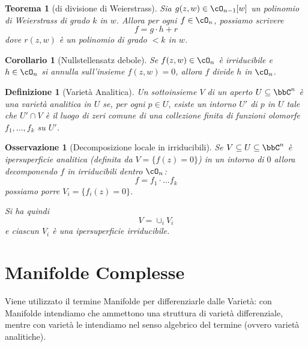 \documentclass[a4paper,11pt]{article}
\newtheorem{teorema}{Teorema}
\newtheorem{definizione}{Definizione}
\newtheorem{corollario}{Corollario}
\newtheorem{osservazione}{Osservazione}
\begin{document}
\begin{teorema}[di divisione di Weierstrass]
  Sia $g(z, w) \in \cO_{n-1}[w]$ un polinomio di Weierstrass di grado $k$ in $w$.
  Allora per ogni $f \in \cO_n$, possiamo scrivere
  $$ f = g \cdot h + r $$
  dove $r(z, w)$ è un polinomio di grado $< k$ in $w$.
\end{teorema}

\begin{corollario}[Nullstellensatz debole]
  Se $f(z, w) \in \cO_n$ è irriducibile e $h \in \cO_n$ si annulla sull'insieme $f(z, w) = 0$, allora $f$ divide $h$ in $\cO_n$.
\end{corollario}

\begin{definizione}[Varietà Analitica]
  Un sottoinsieme $V$ di un aperto $U \subseteq \bbC^n$ è una varietà analitica in $U$ se, per ogni $p \in U$, esiste un intorno $U'$ di $p$ in $U$ tale che $U' \cap V$ è il luogo di zeri comune di una collezione finita di funzioni olomorfe $f_1, \ldots, f_k$ su $U'$.
\end{definizione}

\begin{osservazione}[Decomposizione locale in irriducibili]
  Se $V \subseteq U \subseteq \bbC^n$ è ipersuperficie analitica (definita da $V = \{ f(z) = 0 \}$) in un intorno di $0$ allora decomponendo $f$ in irriducibili dentro $\cO_n$:
  $$f = f_1 \cdot \ldots f_k$$
  possiamo porre $V_i = \{ f_i(z) = 0 \}$.

  Si ha quindi
  $$ V = \cup_i V_i $$
  e ciascun $V_i$ è una ipersuperficie irriducibile.
\end{osservazione}

\section{Manifolde Complesse}
Viene utilizzato il termine Manifolde per differenziarle dalle Varietà: con Manifolde intendiamo che ammettono una struttura di varietà differenziale, mentre con varietà le intendiamo nel senso algebrico del termine (ovvero varietà analitiche).
\end{document}
